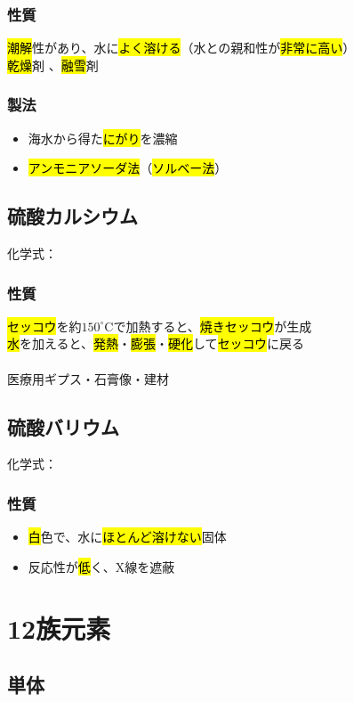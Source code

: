 \subsubsection{性質}
  \hl{潮解}性があり、水に\hl{よく溶ける}（水との親和性が\hl{非常に高い}）\\
  \hl{乾燥}剤 、\hl{融雪}剤
 \subsubsection{製法}
 \begin{itemize}
  \item 海水から得た\hl{にがり}を濃縮  \K
  \item \hl{アンモニアソーダ法}（\hl{ソルベー法}） \K
 \end{itemize}
 \subsection{硫酸カルシウム}
 化学式：\hl{}
 \subsubsection{性質}
  \hl{セッコウ}を約$150^{\circ}$Cで加熱すると、\hl{焼きセッコウ}が生成\\
  \hl{水}を加えると、\hl{発熱}・\hl{膨張}・\hl{硬化}して\hl{セッコウ}に戻る\\
  \\
   医療用ギプス・石膏像・建材
 \subsection{硫酸バリウム}
 化学式：\hl{}
 \subsubsection{性質}
 \begin{itemize}
  \item \hl{白}色で、水に\hl{ほとんど溶けない}固体
  \item 反応性が\hl{低}く、X線を遮蔽
 \end{itemize}
 \section{12族元素}
 \subsection{単体}
